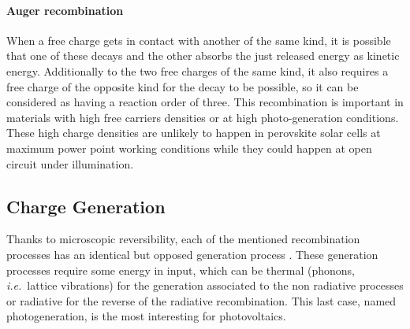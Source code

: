 		\paragraph{Auger recombination}
		When a free charge gets in contact with another of the same kind, it is possible that one of these decays and the other absorbs the just released energy as kinetic energy.
		Additionally to the two free charges of the same kind, it also requires a free charge of the opposite kind for the decay to be possible, so it can be considered as having a reaction order of three.
		This recombination is important in materials with high free carriers densities or at high photo-generation conditions.
		These high charge densities are unlikely to happen in perovskite solar cells at maximum power point working conditions while they could happen at open circuit under illumination.

	\subsection{Charge Generation}
	Thanks to microscopic reversibility, each of the mentioned recombination processes has an identical but opposed generation process \cite[81]{Nelson2003}.
	These generation processes require some energy in input, which can be thermal (phonons, \textsl{i.e.}\ lattice vibrations) for the generation associated to the non radiative processes or radiative for the reverse of the radiative recombination.
	This last case, named photogeneration, is the most interesting for photovoltaics.



